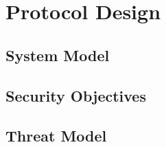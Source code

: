 \documentclass[12pt]{report}
\begin{document}
\chapter{Protocol Design}
\section{System Model}

\section{Security Objectives}

\section{Threat Model}
\end{document}

